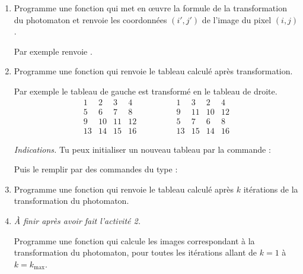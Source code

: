 \documentclass[11pt,class=report,crop=false]{standalone}
\begin{document}
\begin{activite}




\begin{enumerate}
  \item Programme une fonction  qui met en 
  \oe uvre la formule de la transformation du photomaton et renvoie les coordonnées $(i',j')$ de l'image du pixel $(i,j)$.
  
  Par exemple  renvoie .
  
  \item Programme une fonction  qui renvoie le tableau calculé après transformation.

Par exemple le tableau de gauche est transformé en le tableau de droite.
$$\begin{array}{cccc} 
  1& 2& 3& 4\\ 
  5& 6& 7& 8\\  
  9&10&11&12\\  
 13&14&15&16  
\end{array}\qquad\qquad
\begin{array}{cccc} 
  1& 3& 2& 4\\  
  9&11&10&12\\  
  5& 7& 6& 8\\  
 13&15&14&16
\end{array}$$

  \emph{Indications.} Tu peux initialiser un nouveau tableau par la commande :
  
  \centerline{}
  
  Puis le remplir par des commandes du type :
  
  \centerline{}

  \item Programme une fonction  qui renvoie le tableau calculé après $k$ itérations de la transformation du photomaton.
  
  \item \emph{À finir après avoir fait l'activité 2.}
  
  Programme une fonction  qui calcule 
  les images correspondant à la transformation du photomaton, pour toutes les itérations allant de $k=1$ à $k=k_{\max}$.
  

\end{enumerate}
\end{activite}
\end{document}
